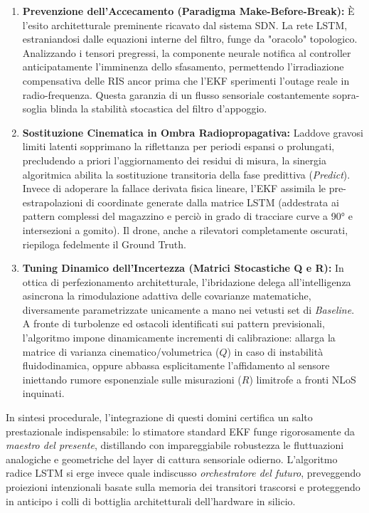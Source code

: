 \documentclass[twoside]{article}
\begin{document}
\begin{enumerate}
    \item \textbf{Prevenzione dell'Accecamento (Paradigma Make-Before-Break):} È l'esito architetturale preminente ricavato dal sistema SDN. La rete LSTM, estraniandosi dalle equazioni interne del filtro, funge da "oracolo" topologico. Analizzando i tensori pregressi, la componente neurale notifica al controller anticipatamente l'imminenza dello sfasamento, permettendo l'irradiazione compensativa delle RIS ancor prima che l'EKF sperimenti l'outage reale in radio-frequenza. Questa garanzia di un flusso sensoriale costantemente sopra-soglia blinda la stabilità stocastica del filtro d'appoggio.
    \item \textbf{Sostituzione Cinematica in Ombra Radiopropagativa:} Laddove gravosi limiti latenti sopprimano la riflettanza per periodi espansi o prolungati, precludendo a priori l'aggiornamento dei residui di misura, la sinergia algoritmica abilita la sostituzione transitoria della fase predittiva (\textit{Predict}). Invece di adoperare la fallace derivata fisica lineare, l'EKF assimila le pre-estrapolazioni di coordinate generate dalla matrice LSTM (addestrata ai pattern complessi del magazzino e perciò in grado di tracciare curve a 90° e intersezioni a gomito). Il drone, anche a rilevatori completamente oscurati, riepiloga fedelmente il Ground Truth.
    \item \textbf{Tuning Dinamico dell'Incertezza (Matrici Stocastiche Q e R):} In ottica di perfezionamento architetturale, l'ibridazione delega all'intelligenza asincrona la rimodulazione adattiva delle covarianze matematiche, diversamente parametrizzate unicamente a mano nei vetusti set di \textit{Baseline}. A fronte di turbolenze ed ostacoli identificati sui pattern previsionali, l'algoritmo impone dinamicamente incrementi di calibrazione: allarga la matrice di varianza cinematico/volumetrica ($Q$) in caso di instabilità fluidodinamica, oppure abbassa esplicitamente l'affidamento al sensore iniettando rumore esponenziale sulle misurazioni ($R$) limitrofe a fronti NLoS inquinati.
\end{enumerate}

In sintesi procedurale, l'integrazione di questi domini certifica un salto prestazionale indispensabile: lo stimatore standard EKF funge rigorosamente da \textit{maestro del presente}, distillando con impareggiabile robustezza le fluttuazioni analogiche e geometriche del layer di cattura sensoriale odierno. L'algoritmo radice LSTM si erge invece quale indiscusso \textit{orchestratore del futuro}, preveggendo proiezioni intenzionali basate sulla memoria dei transitori trascorsi e proteggendo in anticipo i colli di bottiglia architetturali dell'hardware in silicio.
\end{document}
